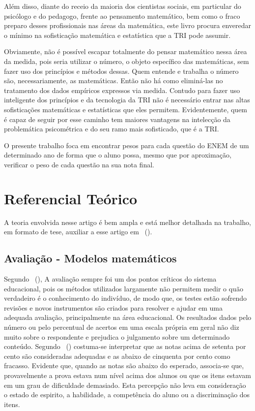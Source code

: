 \documentclass[
	article,			%
	11pt,				%
	oneside,			%
	a4paper,			%
	english,			%
	brazil,				%
	sumario=tradicional
]{abntex2}
\newcommand{\citeaa}[1]{\citeauthoronline{#1}~(\citeyear{#1})}
\begin{document}
		\begin{citacao}
				Além disso, diante do receio da maioria dos cientistas sociais, em particular do psicólogo e do pedagogo, frente ao pensamento 	matemático, bem como o fraco preparo desses profissionais nas áreas da matemática, este livro procura enveredar o mínimo na sofisticação matemática e estatística que a TRI pode assumir. 		
				
				Obviamente, não é possível escapar totalmente do pensar matemático nessa área da medida, pois seria utilizar o número, o objeto específico das matemáticas, sem fazer uso dos princípios e métodos dessas. Quem entende e trabalha o número são, necessariamente, as matemáticas. Então não há como eliminá-las no tratamento dos dados empíricos expressos via medida. Contudo para fazer uso inteligente dos princípios e da tecnologia da TRI não é necessário entrar nas altas sofisticações matemáticas e estatísticas que eles permitem. Evidentemente, quem é capaz de seguir por esse caminho tem maiores vantagens na intelecção da problemática psicométrica e do seu ramo mais sofisticado, que é a TRI.
		\end{citacao}
	
		O presente trabalho foca em encontrar pesos para cada questão do ENEM de um determinado ano de forma que o aluno possa, mesmo que por aproximação, verificar o peso de cada questão na sua nota final.
		
	
	\section{Referencial Teórico}
	
		A teoria envolvida nesse artigo é bem ampla e está melhor detalhada na trabalho, em formato de tese, auxiliar a esse artigo em \citeaa{Figueiredo2021Tese}.
	
		\subsection{Avaliação - Modelos matemáticos}
			Segundo \citeaa{AlvesFerreira2018}, A avaliação sempre foi um dos pontos críticos do sistema educacional, pois os métodos utilizados largamente não permitem medir o quão verdadeiro é o conhecimento do indivíduo, de modo que, os testes estão sofrendo revisões e novos instrumentos são criados para resolver e ajudar em uma adequada avaliação, principalmente na área educacional. Os resultados dados pelo número ou pelo percentual de acertos em uma escala própria em geral não diz muito sobre o respondente e prejudica o julgamento sobre um determinado conteúdo. Segundo \citeaa{Klein2013} costuma-se interpretar que as notas acima de setenta por cento são consideradas adequadas e as abaixo de cinquenta por cento como fracasso. Evidente que, quando as notas são abaixo do esperado, associa-se que, provavelmente a prova estava num nível acima dos alunos ou que os itens estavam em um grau de dificuldade demasiado. Esta percepção não leva em consideração o estado de espirito, a habilidade, a competência do aluno ou a discriminação dos itens.
			
\end{document}
